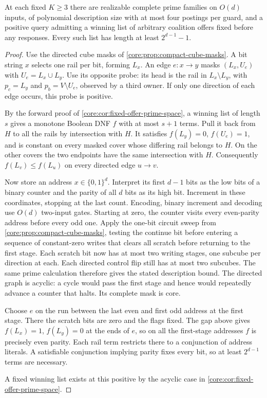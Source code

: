 \begin{proposition}
\label{core:prop:fixed-offer-parity}
At each fixed $K\ge3$ there are realizable complete prime families on
$O(d)$ inputs, of polynomial description size with at most four postings
per guard, and a positive query admitting a winning list of arbitrary
coalition offers fixed before any responses. Every such list has length
at least $2^{d-1}-1$.
\end{proposition}
\begin{proof}
Use the directed cube masks of \cref{core:prop:compact-cube-masks}.
A bit string $x$ selects one rail per bit, forming $L_x$. An edge
$e:x\to y$ masks $(L_x,U_e)$ with $U_e=L_x\cup L_y$.
Use its opposite probe: its head is the rail in $L_x\setminus L_y$,
with $p_c=L_y$ and $p_b=V\setminus U_e$, observed by a third owner.
If only one direction of each edge occurs, this probe is positive.

By the forward proof of \cref{core:cor:fixed-offer-prime-space}, a
winning list of length $s$ gives a monotone Boolean DNF $f$ with at
most $s+1$ terms. Pull it back from $H$ to all the rails by intersection
with $H$. It satisfies $f(L_y)=0$, $f(U_e)=1$, and is constant on
every masked cover whose differing rail belongs to $H$. On the
other covers the two endpoints have the same intersection with $H$.
Consequently $f(L_v)\le f(L_u)$ on every directed edge $u\to v$.

Now store an address $x\in\{0,1\}^d$. Interpret its first $d-1$ bits
as the low bits of a binary counter and the parity of all $d$ bits as
its high bit. Increment in these coordinates, stopping at the last
count. Encoding, binary increment and decoding use $O(d)$ two-input
gates. Starting at zero, the counter visits every even-parity address
before every odd one. Apply the one-bit circuit sweep from
\cref{core:prop:compact-cube-masks}, testing the continue bit before
entering a sequence of constant-zero writes that clears all scratch
before returning to the first stage. Each scratch bit now has at most
two writing stages, one subcube per direction at each. Each directed
control flip still has at most two subcubes. The same prime calculation
therefore gives the stated description bound. The directed graph is
acyclic: a cycle would pass the first stage and hence would repeatedly
advance a counter that halts. Its complete mask is core.

Choose $e$ on the run between the last even and first odd address at
the first stage. There the scratch bits are zero and the flags fixed.
The gap above gives $f(L_x)=1$, $f(L_y)=0$ at the ends of $e$, so on
all the first-stage addresses $f$ is precisely even parity.
Each rail term restricts there to a conjunction of address literals.
A satisfiable conjunction implying parity fixes every bit, so at least
$2^{d-1}$ terms are necessary.

A fixed winning list exists at this positive by the acyclic case in
\cref{core:cor:fixed-offer-prime-space}.
\end{proof}

